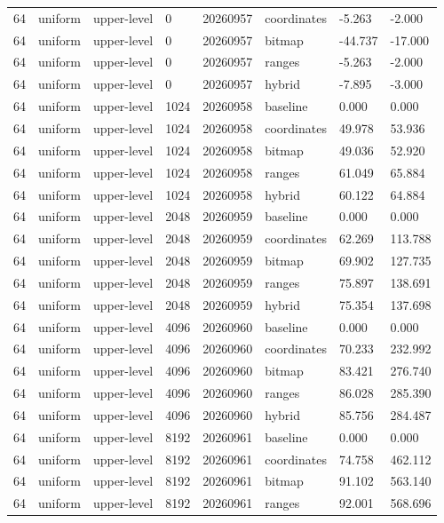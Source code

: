\begin{tabular}{llllllll}
64 & uniform & upper-level & 0 & 20260957 & coordinates & -5.263 & -2.000 \\
64 & uniform & upper-level & 0 & 20260957 & bitmap & -44.737 & -17.000 \\
64 & uniform & upper-level & 0 & 20260957 & ranges & -5.263 & -2.000 \\
64 & uniform & upper-level & 0 & 20260957 & hybrid & -7.895 & -3.000 \\
64 & uniform & upper-level & 1024 & 20260958 & baseline & 0.000 & 0.000 \\
64 & uniform & upper-level & 1024 & 20260958 & coordinates & 49.978 & 53.936 \\
64 & uniform & upper-level & 1024 & 20260958 & bitmap & 49.036 & 52.920 \\
64 & uniform & upper-level & 1024 & 20260958 & ranges & 61.049 & 65.884 \\
64 & uniform & upper-level & 1024 & 20260958 & hybrid & 60.122 & 64.884 \\
64 & uniform & upper-level & 2048 & 20260959 & baseline & 0.000 & 0.000 \\
64 & uniform & upper-level & 2048 & 20260959 & coordinates & 62.269 & 113.788 \\
64 & uniform & upper-level & 2048 & 20260959 & bitmap & 69.902 & 127.735 \\
64 & uniform & upper-level & 2048 & 20260959 & ranges & 75.897 & 138.691 \\
64 & uniform & upper-level & 2048 & 20260959 & hybrid & 75.354 & 137.698 \\
64 & uniform & upper-level & 4096 & 20260960 & baseline & 0.000 & 0.000 \\
64 & uniform & upper-level & 4096 & 20260960 & coordinates & 70.233 & 232.992 \\
64 & uniform & upper-level & 4096 & 20260960 & bitmap & 83.421 & 276.740 \\
64 & uniform & upper-level & 4096 & 20260960 & ranges & 86.028 & 285.390 \\
64 & uniform & upper-level & 4096 & 20260960 & hybrid & 85.756 & 284.487 \\
64 & uniform & upper-level & 8192 & 20260961 & baseline & 0.000 & 0.000 \\
64 & uniform & upper-level & 8192 & 20260961 & coordinates & 74.758 & 462.112 \\
64 & uniform & upper-level & 8192 & 20260961 & bitmap & 91.102 & 563.140 \\
64 & uniform & upper-level & 8192 & 20260961 & ranges & 92.001 & 568.696 \\

\end{tabular}
